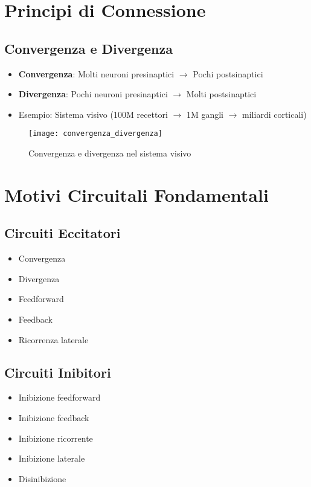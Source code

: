 \documentclass[12pt]{article}
\begin{document}
\section{Principi di Connessione}
\subsection{Convergenza e Divergenza}
\begin{itemize}
    \item \textbf{Convergenza}: Molti neuroni presinaptici $\rightarrow$ Pochi postsinaptici
    \item \textbf{Divergenza}: Pochi neuroni presinaptici $\rightarrow$ Molti postsinaptici
    \item Esempio: Sistema visivo (100M recettori $\rightarrow$ 1M gangli $\rightarrow$ miliardi corticali)
\end{itemize}

\begin{figure}[h]
    \centering
    \texttt{[image: convergenza\_divergenza]}
    \caption{Convergenza e divergenza nel sistema visivo}
\end{figure}

\section{Motivi Circuitali Fondamentali}
\subsection{Circuiti Eccitatori}
\begin{itemize}
    \item Convergenza
    \item Divergenza
    \item Feedforward
    \item Feedback
    \item Ricorrenza laterale
\end{itemize}

\subsection{Circuiti Inibitori}
\begin{itemize}
    \item Inibizione feedforward
    \item Inibizione feedback
    \item Inibizione ricorrente
    \item Inibizione laterale
    \item Disinibizione
\end{itemize}
\end{document}
